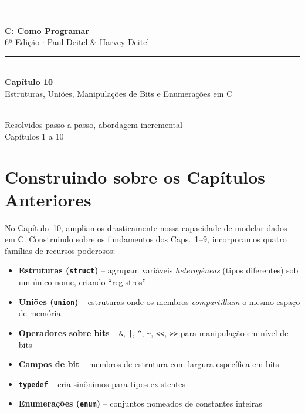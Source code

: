 \documentclass[12pt,a4paper]{article}
\begin{document}
\begin{titlepage}
  \centering\vspace*{2cm}
  {\color{deitelblue}\rule{\linewidth}{2pt}}\\[0.4cm]
  {\huge\bfseries\color{deitelblue}C: Como Programar}\\[0.2cm]
  {\large\color{deitelblue}6ª Edição $\cdot$ Paul Deitel \& Harvey Deitel}\\[0.2cm]
  {\color{deitelblue}\rule{\linewidth}{2pt}}\\[1cm]
  {\LARGE\bfseries Capítulo 10}\\[0.3cm]
  {\Large\color{deitelblue!80}Estruturas, Uniões, Manipulações de Bits e Enumerações em C}\\[0.8cm]
  \begin{tcolorbox}[colback=deitellightblue,colframe=deitelblue,width=0.85\linewidth]
    \\[0.2cm]
    {\normalsize Resolvidos passo a passo, abordagem incremental\\
    Capítulos 1 a 10}
  \end{tcolorbox}
\end{titlepage}

\section*{Construindo sobre os Capítulos Anteriores}

No Capítulo~10, ampliamos drasticamente nossa capacidade de modelar dados em C.
Construindo sobre os fundamentos dos Caps.~1--9, incorporamos quatro famílias de
recursos poderosos:

\begin{itemize}[noitemsep]
  \item \textbf{Estruturas (\texttt{struct})} -- agrupam variáveis \textit{heterogêneas}
  (tipos diferentes) sob um único nome, criando ``registros''
  \item \textbf{Uniões (\texttt{union})} -- estruturas onde os membros
  \textit{compartilham} o mesmo espaço de memória
  \item \textbf{Operadores sobre bits} -- \texttt{\&}, \texttt{|}, \texttt{\^{}},
  \texttt{\~{}}, \texttt{<<}, \texttt{>>} para manipulação em nível de bits
  \item \textbf{Campos de bit} -- membros de estrutura com largura específica em bits
  \item \textbf{\texttt{typedef}} -- cria sinônimos para tipos existentes
  \item \textbf{Enumerações (\texttt{enum})} -- conjuntos nomeados de constantes inteiras
\end{itemize}
\end{document}
